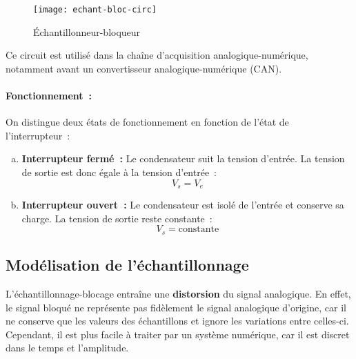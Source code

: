 \begin{figure}[H]
    \centering
    \texttt{[image: echant-bloc-circ]}
    \caption{\'Echantillonneur-bloqueur}
    \label{figEchantillonneur}
\end{figure}

Ce circuit est utilisé dans la chaîne d'acquisition analogique-numérique, notamment avant un convertisseur analogique-numérique (CAN).

\paragraph{Fonctionnement~:}
On distingue deux états de fonctionnement en fonction de l'état de l'interrupteur~:

\begin{enumerate}[(a)]
    \item \textbf{Interrupteur fermé~:} Le condensateur suit la tension d'entrée. La tension de sortie est donc égale à la tension d'entrée~:\\
    \[
        V_s = V_e
    \]
    
    \item \textbf{Interrupteur ouvert~:} Le condensateur est isolé de l'entrée et conserve sa charge. La tension de sortie reste constante~:\\
    \[
        V_s = \text{constante}
    \]
\end{enumerate}

\subsection{Mod\'elisation de l'échantillonnage}
L'\'echantillonnage-blocage entraîne une \textbf{distorsion} du signal analogique. 
En effet, le signal bloqué ne représente pas fidèlement le signal analogique d'origine, 
car il ne conserve que les valeurs des échantillons et ignore les variations entre celles-ci. 
Cependant, il est plus facile à traiter par un système numérique, car il est discret dans le temps et l'amplitude.

